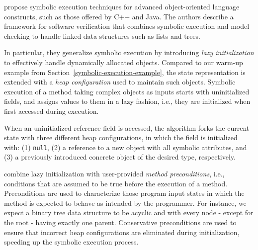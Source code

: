 %

\label{ss:complex-objects}

\cite{KPV-TACAS03} propose symbolic execution techniques for advanced object-oriented language constructs, such as those offered by C++ and Java. The authors describe a framework for software verification that combines symbolic execution and model checking to handle linked data structures such as lists and trees. %

In particular, they generalize symbolic execution by introducing {\em lazy initialization} to effectively handle dynamically allocated objects. Compared to our warm-up example from Section~\ref{symbolic-execution-example}, the state representation is extended with a {\em heap configuration} used to maintain such objects. Symbolic execution of a method taking complex objects as inputs starts with uninitialized fields, and assigns values to them in a lazy fashion, i.e., they are initialized when first accessed during execution.

When an uninitialized reference field is accessed, the algorithm forks the current state with three different heap configurations, in which the field is initialized with: (1) {\tt null}, (2) a reference to a new object with all symbolic attributes, and (3) a previously introduced concrete object of the desired type, respectively. 

\cite{KPV-TACAS03,SPF-ISSTA04} combine lazy initialization with user-provided {\em method preconditions}, i.e., conditions that are assumed to be true before the execution of a method. Preconditions are used to characterize those program input states in which the method is expected to behave as intended by the programmer. For instance, we expect a binary tree data structure to be acyclic and with every node - except for the root - having exactly one parent. Conservative preconditions are used to ensure that incorrect heap configurations are eliminated during initialization, speeding up the symbolic execution process. %

